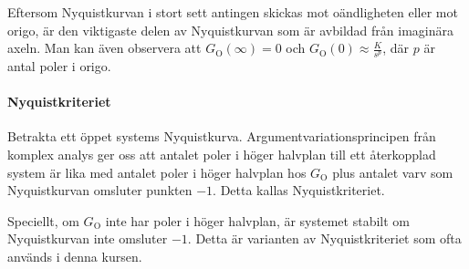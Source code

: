 Eftersom Nyquistkurvan i stort sett antingen skickas mot oändligheten eller mot origo, är den viktigaste delen av Nyquistkurvan som är avbildad från imaginära axeln. Man kan även observera att $G_{\text{O}}(\infty) = 0$ och $G_{\text{O}}(0)\approx\frac{K}{s^{p}}$, där $p$ är antal poler i origo.

\paragraph{Nyquistkriteriet}
Betrakta ett öppet systems Nyquistkurva. Argumentvariationsprincipen från komplex analys ger oss att antalet poler i höger halvplan till ett återkopplad system är lika med antalet poler i höger halvplan hos $G_{\text{O}}$ plus antalet varv som Nyquistkurvan omsluter punkten $-1$. Detta kallas Nyquistkriteriet.

Speciellt, om $G_{\text{O}}$ inte har poler i höger halvplan, är systemet stabilt om Nyquistkurvan inte omsluter $-1$. Detta är varianten av Nyquistkriteriet som ofta används i denna kursen.
